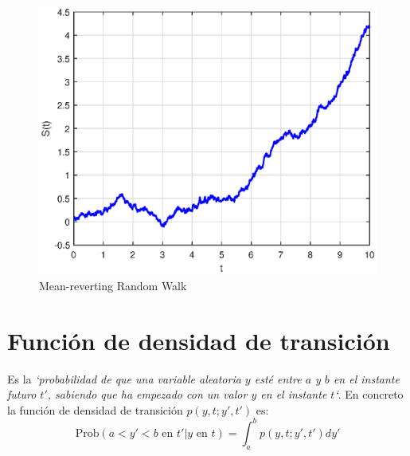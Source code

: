 \begin{itemize}
    \begin{figure}[H]
        \centering
        \includegraphics[width=0.65\linewidth]{Imagenes/3_Aleatoriedad/MeanRevertingWalk.eps}
        \caption{Mean-reverting Random Walk}
    \end{figure}
\end{itemize}



\section{Función de densidad de transición}
Es la \textit{`probabilidad de que una variable aleatoria $y$ esté entre $a$ y $b$ en el instante futuro $t'$, sabiendo que ha empezado con un valor $y$ en el instante $t$`}. En concreto la función de densidad de transición $p(y, t; y', t')$ es:
\[
    \boxed{\text{Prob}(a<y'<b\text{ en }t' | y\text{ en }t) = \int_a^b p(y, t; y', t') dy'}
\]

